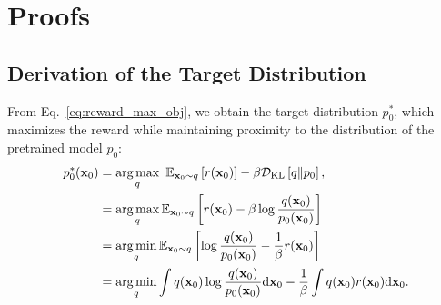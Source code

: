 
  



\ifpaper
\else

        

\section{Proofs}
\label{sec:appendix_policy_derivations}
\subsection{Derivation of the Target Distribution}
\label{sec:appendix_optimal_marginal_target}
From Eq.~\ref{eq:reward_max_obj}, we obtain the target distribution $p^{*}_0$, which maximizes the reward while maintaining proximity to the distribution of the pretrained model $p_0$:
\begin{align}
    \nonumber
    p^{*}_0(\mathbf{x}_0) &= \operatorname*{arg\,max}_{q} \  \mathbb{E}_{\mathbf{x}_0 \sim q} \left[ r(\mathbf{x}_0) \right] -\beta \mathcal{D}_{\text{KL}} \left[ q \| p_0 \right], \\
    \nonumber
    &= \operatorname*{arg\,max}_{q} \mathbb{E}_{\mathbf{x}_0 \sim q} \left[r(\mathbf{x}_0) - \beta \log \frac{q(\mathbf{x}_0)}{p_0(\mathbf{x}_0)} \right] \\
    \nonumber
    &= \operatorname*{arg\,min}_{q} \mathbb{E}_{\mathbf{x}_0 \sim q} \left[\log \frac{q (\mathbf{x}_0)}{p_0(\mathbf{x}_0)} - \frac{1}{\beta} r(\mathbf{x}_0) \right] \\
    \nonumber
    &= \operatorname*{arg\,min}_{q} \int q(\mathbf{x}_0) \log \frac{q(\mathbf{x}_0)}{p_0 (\mathbf{x}_0)} \mathrm{d} \mathbf{x}_0 -\frac{1}{\beta} \int q(\mathbf{x}_0) r(\mathbf{x}_0) \mathrm{d} \mathbf{x}_0.
\end{align}

